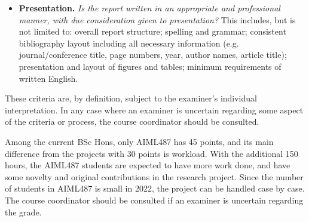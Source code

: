 \begin{itemize}
\item {\bf Presentation.}  {\em Is the report written in an
    appropriate and professional manner, with due consideration given
    to presentation?}  This includes, but is not limited to: overall
  report structure; spelling and grammar; consistent bibliography
  layout including all necessary information (e.g. journal/conference
  title, page numbers, year, author names, article title);
  presentation and layout of figures and tables; minimum requirements
  of written English.

\end{itemize}
These criteria are, by definition, subject to the examiner's
individual interpretation.  In any case where an examiner is uncertain
regarding some aspect of the criteria or process, the course
coordinator should be consulted.

Among the current BSc Hons, only AIML487 has 45 points, and its main difference 
from the projects with 30 points is workload. With the additional 150 hours, 
the AIML487 students are expected to have more work done, and have some 
novelty and original contributions in the research project. 
Since the number of students in AIML487 is small in 2022, the project can be handled case by case. 
The course coordinator should be consulted if an examiner is uncertain regarding the grade. 
